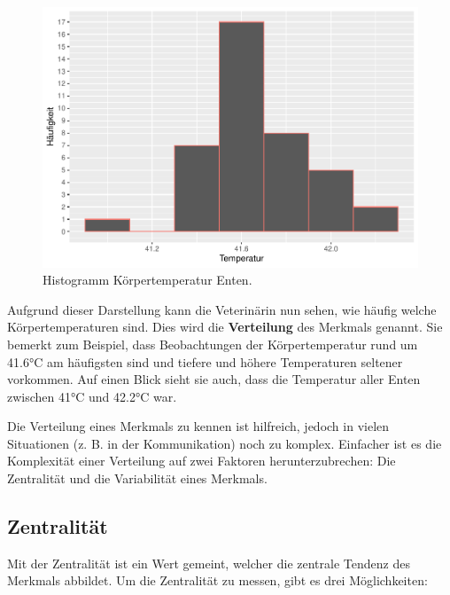 \documentclass[
]{book}
\theoremstyle{definition}
\theoremstyle{definition}
\theoremstyle{definition}
\theoremstyle{definition}
\theoremstyle{remark}
\begin{document}
\begin{figure}
\centering
\includegraphics{aps_statistik1_files/figure-latex/exm-ducktemp-histogramm-1.pdf}
\caption{\label{fig:exm-ducktemp-histogramm}Histogramm Körpertemperatur Enten.}
\end{figure}

Aufgrund dieser Darstellung kann die Veterinärin nun sehen, wie häufig welche Körpertemperaturen sind. Dies wird die \textbf{Verteilung} des Merkmals genannt. Sie bemerkt zum Beispiel, dass Beobachtungen der Körpertemperatur rund um 41.6°C am häufigsten sind und tiefere und höhere Temperaturen seltener vorkommen. Auf einen Blick sieht sie auch, dass die Temperatur aller Enten zwischen 41°C und 42.2°C war.

Die Verteilung eines Merkmals zu kennen ist hilfreich, jedoch in vielen Situationen (z. B. in der Kommunikation) noch zu komplex. Einfacher ist es die Komplexität einer Verteilung auf zwei Faktoren herunterzubrechen: Die Zentralität und die Variabilität eines Merkmals.

\subsection{Zentralität}\label{zentralitaet}

Mit der Zentralität ist ein Wert gemeint, welcher die zentrale Tendenz des Merkmals abbildet. Um die Zentralität zu messen, gibt es drei Möglichkeiten:
\end{document}
